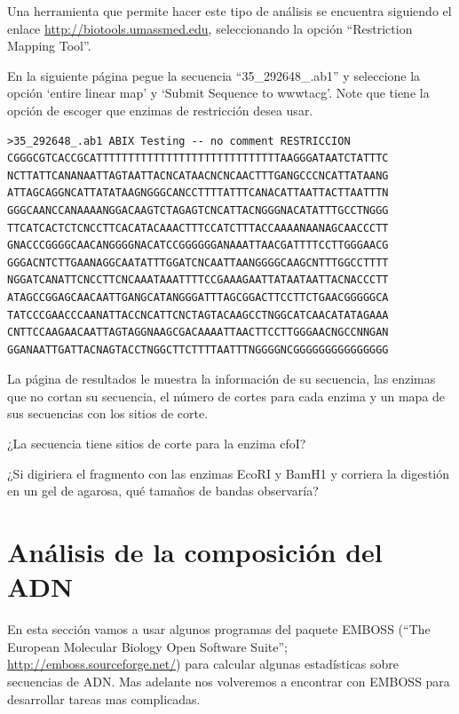 \documentclass[letter,11pt]{book}
\begin{document}
Una herramienta que permite hacer este tipo de análisis se encuentra siguiendo el enlace \url{http://biotools.umassmed.edu}, seleccionando la opción ``Restriction Mapping Tool''. 

En la siguiente página pegue la secuencia ``35\_292648\_.ab1'' y seleccione la opción ‘entire linear map’ y ‘Submit Sequence to wwwtacg’. Note que tiene la opción de escoger que enzimas de restricción desea usar.

\begin{Verbatim}[commandchars=!\{\},numbers=none,label=Secuencia 35\_292648\_.ab1,frame=topline,fontsize=\scriptsize]
>35_292648_.ab1 ABIX Testing -- no comment RESTRICCION
CGGGCGTCACCGCATTTTTTTTTTTTTTTTTTTTTTTTTTTTTAAGGGATAATCTATTTC
NCTTATTCANANAATTAGTAATTACNCATAACNCNCAACTTTGANGCCCNCATTATAANG
ATTAGCAGGNCATTATATAAGNGGGCANCCTTTTATTTCANACATTAATTACTTAATTTN
GGGCAANCCANAAAANGGACAAGTCTAGAGTCNCATTACNGGGNACATATTTGCCTNGGG
TTCATCACTCTCNCCTTCACATACAAACTTTCCATCTTTACCAAAANAANAGCAACCCTT
GNACCCGGGGCAACANGGGGNACATCCGGGGGGANAAATTAACGATTTTCCTTGGGAACG
GGGACNTCTTGAANAGGCAATATTTGGATCNCAATTAANGGGGCAAGCNTTTGGCCTTTT
NGGATCANATTCNCCTTCNCAAATAAATTTTCCGAAAGAATTATAATAATTACNACCCTT
ATAGCCGGAGCAACAATTGANGCATANGGGATTTAGCGGACTTCCTTCTGAACGGGGGCA
TATCCCGAACCCAANATTACCNCATTCNCTAGTACAAGCCTNGGCATCAACATATAGAAA
CNTTCCAAGAACAATTAGTAGGNAAGCGACAAAATTAACTTCCTTGGGAACNGCCNNGAN
GGANAATTGATTACNAGTACCTNGGCTTCTTTTAATTTNGGGGNCGGGGGGGGGGGGGGG
\end{Verbatim}

La página de resultados le muestra la información de su secuencia, las enzimas que no cortan su secuencia, el número de cortes para cada enzima y un mapa de sus secuencias con los sitios de corte.

{\color{red}
¿La secuencia tiene sitios de corte para la enzima cfoI?

¿Si digiriera el fragmento con las enzimas EcoRI y BamH1 y corriera la digestión en un gel de agarosa, qué tamaños de bandas observaría?
}

\section{Análisis de la composición del ADN}

En esta sección vamos a usar algunos programas del paquete EMBOSS (``The European Molecular Biology Open Software Suite''; \url{http://emboss.sourceforge.net/}) para calcular algunas estadísticas sobre secuencias de ADN. Mas adelante nos volveremos a encontrar con EMBOSS para desarrollar tareas mas complicadas.
\end{document}
